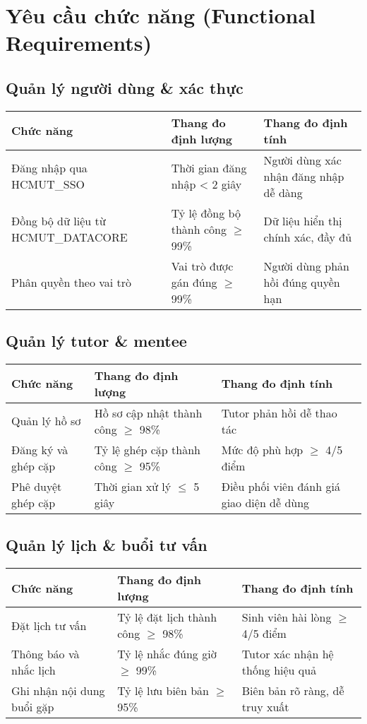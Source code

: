 \section{Yêu cầu chức năng (Functional Requirements)}

\subsection{Quản lý người dùng \& xác thực}
\begin{tabular}{|p{4cm}|p{5cm}|p{4cm}|}
\hline
\textbf{Chức năng} & \textbf{Thang đo định lượng} & \textbf{Thang đo định tính} \\
\hline
Đăng nhập qua HCMUT\_SSO & Thời gian đăng nhập < 2 giây & Người dùng xác nhận đăng nhập dễ dàng \\
\hline
Đồng bộ dữ liệu từ HCMUT\_DATACORE & Tỷ lệ đồng bộ thành công $\geq$ 99\% & Dữ liệu hiển thị chính xác, đầy đủ \\
\hline
Phân quyền theo vai trò & Vai trò được gán đúng $\geq$ 99\% & Người dùng phản hồi đúng quyền hạn \\
\hline
\end{tabular}

\vspace{1em}
\subsection{Quản lý tutor \& mentee}
\begin{tabular}{|p{4cm}|p{5cm}|p{4cm}|}
\hline
\textbf{Chức năng} & \textbf{Thang đo định lượng} & \textbf{Thang đo định tính} \\
\hline
Quản lý hồ sơ & Hồ sơ cập nhật thành công $\geq$ 98\% & Tutor phản hồi dễ thao tác \\
\hline
Đăng ký và ghép cặp & Tỷ lệ ghép cặp thành công $\geq$ 95\% & Mức độ phù hợp $\geq$ 4/5 điểm \\
\hline
Phê duyệt ghép cặp & Thời gian xử lý $\leq$ 5 giây & Điều phối viên đánh giá giao diện dễ dùng \\
\hline
\end{tabular}

\vspace{1em}
\subsection{Quản lý lịch \& buổi tư vấn}
\begin{tabular}{|p{4cm}|p{5cm}|p{4cm}|}
\hline
\textbf{Chức năng} & \textbf{Thang đo định lượng} & \textbf{Thang đo định tính} \\
\hline
Đặt lịch tư vấn & Tỷ lệ đặt lịch thành công $\geq$ 98\% & Sinh viên hài lòng $\geq$ 4/5 điểm \\
\hline
Thông báo và nhắc lịch & Tỷ lệ nhắc đúng giờ $\geq$ 99\% & Tutor xác nhận hệ thống hiệu quả \\
\hline
Ghi nhận nội dung buổi gặp & Tỷ lệ lưu biên bản $\geq$ 95\% & Biên bản rõ ràng, dễ truy xuất \\
\hline
\end{tabular}

